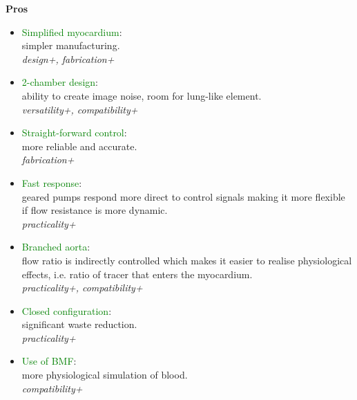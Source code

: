 \begin{minipage}[t]{0.5\textwidth}
\centering\textbf{Pros}
\begin{itemize} [noitemsep]
	\item \textcolor{green}{Simplified myocardium}: \\ simpler manufacturing. \\ \textit{design+, fabrication+}
	\item \textcolor{green}{2-chamber design}: \\ ability to create image noise, room for lung-like element. \\ \textit{versatility+, compatibility+}
	\item \textcolor{green}{Straight-forward control}: \\ more reliable and accurate. \\ \textit{fabrication+}
	\item \textcolor{green}{Fast response}: \\ geared pumps respond more direct to control signals making it more flexible if flow resistance is more dynamic. \\ \textit{practicality+}
	\item \textcolor{green}{Branched aorta}: \\ flow ratio is indirectly controlled which makes it easier to realise physiological effects, i.e. ratio of tracer that enters the myocardium. \\ \textit{practicality+, compatibility+}
	\item \textcolor{green}{Closed configuration}: \\ significant waste reduction. \\ \textit{practicality+}
	\item \textcolor{green}{Use of BMF}: \\ more physiological simulation of blood. \\ \textit{compatibility+}
\end{itemize}
\end{minipage}%

